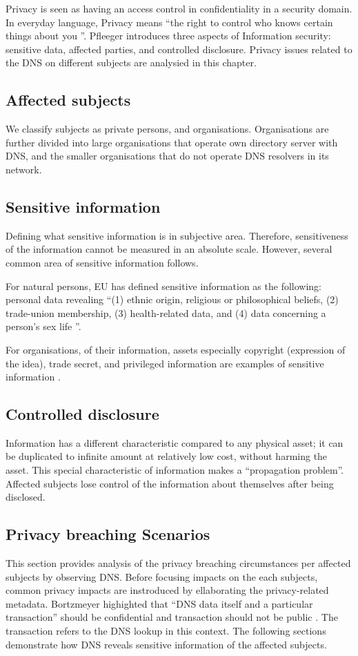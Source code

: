 Privacy is seen as having an access control in confidentiality in a security domain.
In everyday language, Privacy means ``the right to control who knows certain things about you \cite{securityincomputing}''.
Pfleeger introduces three aspects of Information security: sensitive data, affected parties, and controlled disclosure.
Privacy issues related to the DNS on different subjects are analysied in this chapter.

\subsection{Affected subjects}
We classify subjects as private persons, and organisations. Organisations are further divided into large organisations that operate own directory server with DNS, and the smaller organisations that do not operate DNS resolvers in its network.

\subsection{Sensitive information}\label{sensitiveinformation}
Defining what sensitive information is in subjective area.
Therefore, sensitiveness of the information cannot be measured in an absolute scale. However, several common area of sensitive information follows.

For natural persons, EU has defined sensitive information as the following: personal data revealing ``(1) ethnic origin, religious or philosophical beliefs, (2) trade-union membership, (3) health-related data, and (4) data concerning a person's sex life \cite{GDPR}''.

For organisations, of their information, assets especially copyright (expression of the idea), trade secret, and privileged information are examples of sensitive information \cite{securityincomputing}.

\subsection{Controlled disclosure}
Information has a different characteristic compared to any physical asset; it can be duplicated to infinite amount at relatively low cost, without harming the asset.
This special characteristic of information makes a ``propagation problem''.
Affected subjects lose control of the information about themselves after being disclosed.

\subsection{Privacy breaching Scenarios}
This section provides analysis of the privacy breaching circumstances per affected subjects by observing DNS. Before focusing impacts on the each subjects, common privacy impacts are instroduced by ellaborating the privacy-related metadata.
Bortzmeyer highighted that ``DNS data itself and a particular transaction'' should be confidential and transaction should not be public \cite{rfc7626}. The transaction refers to the DNS lookup in this context.
The following sections demonstrate how DNS reveals sensitive information of the affected subjects.

